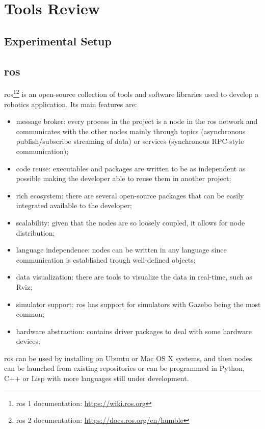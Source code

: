 \chapter{Tools Review}
\label{chapter:tools_review}

\section{Experimental Setup}

\section{\acf{ros}}

\acs{ros}\cite{ROS2}\footnote{\acs{ros} 1 documentation: \url{https://wiki.ros.org}}\footnote{\acs{ros} 2 documentation: \url{https://docs.ros.org/en/humble}} is an open-source collection of tools and software libraries used to develop a robotics application. Its main features are:

\begin{itemize}
    \item message broker: every process in the project is a node in the \acs{ros} network and communicates with the other nodes mainly through topics (asynchronous publish/subscribe streaming of data) or services (synchronous RPC-style communication);
    \item code reuse: executables and packages are written to be as independent as possible making the developer able to reuse them in another project;
    \item rich ecosystem: there are several open-source packages that can be easily integrated available to the developer;
    \item scalability: given that the nodes are so loosely coupled, it allows for node distribution;
    \item language independence: nodes can be written in any language since communication is established trough well-defined objects;
    \item data visualization: there are tools to visualize the data in real-time, such as Rviz;
    \item simulator support: \acs{ros} has support for simulators with Gazebo being the most common;
    \item hardware abstraction: contains driver packages to deal with some hardware devices;
\end{itemize}

\acs{ros} can be used by installing on Ubuntu or Mac OS X systems, and then nodes can be launched from existing repositories or can be programmed in Python, C++ or Lisp with more languages still under development.

